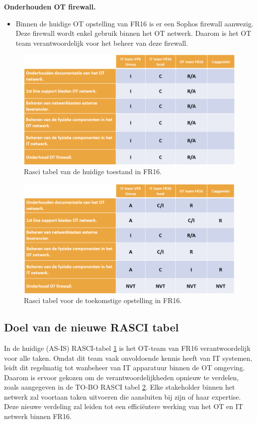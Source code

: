 \textbf{Onderhouden OT firewall.}
\begin{itemize}[label=\textbullet]
    \item Binnen de huidige OT opstelling van FR16 is er een Sophos firewall aanwezig. Deze firewall wordt enkel gebruik binnen het OT netwerk. Daarom is het OT team verantwoordelijk voor het beheer van deze firewall.
\end{itemize}



\begin{figure}[H]
    \centering
    \includegraphics[width=1\textwidth]{fotos/Rasci_AS-IS.png}
    \caption[Foto Rasci AS-IS]{\label{fig:Rasci_AS-IS}Rasci tabel van de huidige toestand in FR16.}
\end{figure} 

\begin{figure}[H]
    \centering
    \includegraphics[width=1\textwidth]{fotos/Rasci_TO-BE.png}
    \caption[Foto Rasci TO-BE]{\label{fig:Rasci_TO-BE}Rasci tabel voor de toekomstige opstelling in FR16.}
\end{figure} 


\subsection{Doel van de nieuwe RASCI tabel}
In de huidige (AS-IS) RASCI-tabel \ref{fig:Rasci_AS-IS} is het OT-team van FR16 verantwoordelijk voor alle taken. Omdat dit team vaak onvoldoende kennis heeft van IT systemen, leidt dit regelmatig tot wanbeheer van IT apparatuur binnen de OT omgeving. Daarom is ervoor gekozen om de verantwoordelijkheden opnieuw te verdelen, zoals aangegeven in de TO-BO RASCI tabel \ref{fig:Rasci_TO-BE}. Elke stakeholder binnen het netwerk zal voortaan taken uitvoeren die aansluiten bij zijn of haar expertise. Deze nieuwe verdeling zal leiden tot een efficiëntere werking van het OT en IT netwerk binnen FR16.

